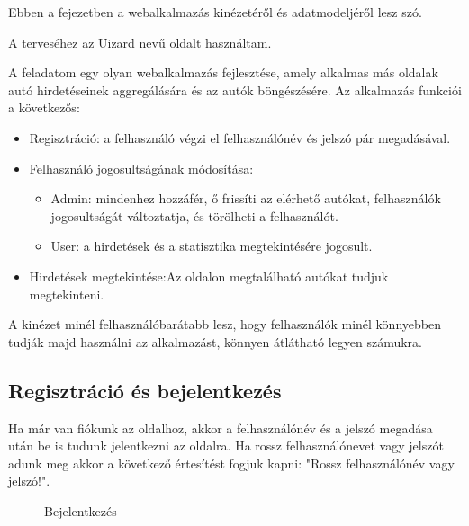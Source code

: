 Ebben a fejezetben a webalkalmazás kinézetéről és adatmodeljéről lesz szó.

A terveséhez az Uizard \cite{uizard} nevű oldalt használtam.


A feladatom egy olyan webalkalmazás fejlesztése, amely alkalmas más oldalak autó hirdetéseinek aggregálására és az autók böngészésére. Az alkalmazás funkciói a következős:

\begin{itemize}
\item Regisztráció: a felhasználó végzi el felhasználónév és jelszó pár megadásával.
\item Felhasználó jogosultságának módosítása:
	\begin{itemize}
	\item Admin: mindenhez hozzáfér, ő frissíti az elérhető autókat, felhasználók jogosultságát változtatja, és törölheti a felhasználót.
	\item User: a hirdetések és a statisztika megtekintésére jogosult.
	\end{itemize}
\item Hirdetések megtekintése:Az oldalon megtalálható autókat tudjuk megtekinteni.
\end{itemize}


A kinézet minél felhasználóbarátabb lesz, hogy felhasználók minél könnyebben tudják majd használni az alkalmazást, könnyen átlátható legyen számukra.

\subsection{Regisztráció és bejelentkezés}

Ha már van fiókunk az oldalhoz, akkor a felhasználónév és a jelszó megadása után be is tudunk jelentkezni az oldalra. Ha rossz felhasználónevet vagy jelszót adunk meg akkor a következő értesítést fogjuk kapni: "Rossz felhasználónév vagy jelszó!".

\newpage

\begin{figure}[h]
\centering
{}
\caption{Bejelentkezés}
\label{fig:Bejelentkezés}
\end{figure}

